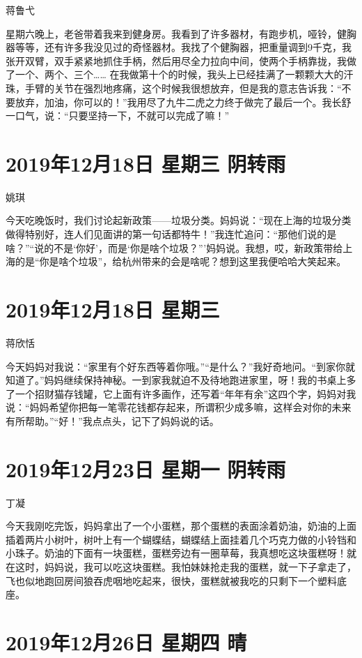 蒋鲁弋

星期六晚上，老爸带着我来到健身房。我看到了许多器材，有跑步机，哑铃，健胸器等等，还有许多我没见过的奇怪器材。我找了个健胸器，把重量调到9千克，我张开双臂，双手紧紧地抓住手柄，然后用尽全力拉向中间，使两个手柄靠拢，我做了一个、两个、三个…… 在我做第十个的时候，我头上已经挂满了一颗颗大大的汗珠，手臂的关节在强烈地疼痛，这个时候我很想放弃，但是我的意志告诉我：“不要放弃，加油，你可以的！”我用尽了九牛二虎之力终于做完了最后一个。我长舒一口气，说：“只要坚持一下，不就可以完成了嘛！”

\section{2019年12月18日 星期三 阴转雨}

姚琪

今天吃晚饭时，我们讨论起新政策——垃圾分类。妈妈说：“现在上海的垃圾分类做得特别好，连人们见面讲的第一句话都特牛！”我连忙追问：“那他们说的是啥？”“说的不是`你好'，而是`你是啥个垃圾？”'妈妈说。我想，哎，新政策带给上海的是“你是啥个垃圾”，给杭州带来的会是啥呢？想到这里我便哈哈大笑起来。

\section{2019年12月18日 星期三}

蒋欣恬

今天妈妈对我说：“家里有个好东西等着你哦。”“是什么？”我好奇地问。“到家你就知道了。”妈妈继续保持神秘。一到家我就迫不及待地跑进家里，呀！我的书桌上多了一个招财猫存钱罐，它上面有许多画作，还写着“年年有余”这四个字，妈妈对我说：“妈妈希望你把每一笔零花钱都存起来，所谓积少成多嘛，这样会对你的未来有所帮助。”“好！”我点点头，记下了妈妈说的话。

\section{2019年12月23日 星期一 阴转雨}

丁凝

今天我刚吃完饭，妈妈拿出了一个小蛋糕，那个蛋糕的表面涂着奶油，奶油的上面插着两片小树叶，树叶上有一个蝴蝶结，蝴蝶结上面挂着几个巧克力做的小铃铛和小珠子。奶油的下面有一块蛋糕，蛋糕旁边有一圈草莓，我真想吃这块蛋糕呀！就在这时，妈妈说，我可以吃这块蛋糕。我怕妹妹抢走我的蛋糕，就一下子拿走了，飞也似地跑回房间狼吞虎咽地吃起来，很快，蛋糕就被我吃的只剩下一个塑料底座。

\section{2019年12月26日 星期四 晴}

